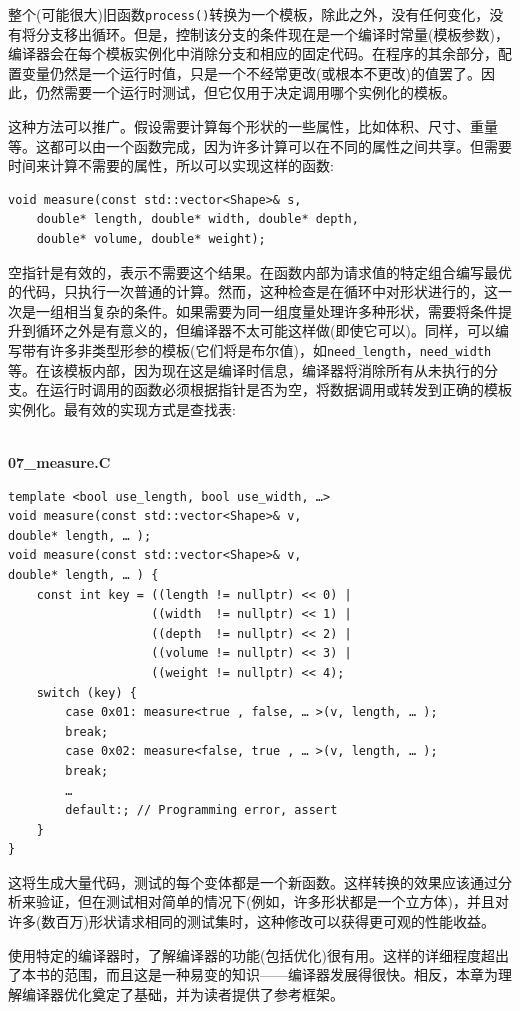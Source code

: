 整个(可能很大)旧函数\texttt{process()}转换为一个模板，除此之外，没有任何变化，没有将分支移出循环。但是，控制该分支的条件现在是一个编译时常量(模板参数)，编译器会在每个模板实例化中消除分支和相应的固定代码。在程序的其余部分，配置变量仍然是一个运行时值，只是一个不经常更改(或根本不更改)的值罢了。因此，仍然需要一个运行时测试，但它仅用于决定调用哪个实例化的模板。

这种方法可以推广。假设需要计算每个形状的一些属性，比如体积、尺寸、重量等。这都可以由一个函数完成，因为许多计算可以在不同的属性之间共享。但需要时间来计算不需要的属性，所以可以实现这样的函数:

\begin{lstlisting}[style=styleCXX]
void measure(const std::vector<Shape>& s,
	double* length, double* width, double* depth,
	double* volume, double* weight);
\end{lstlisting}

空指针是有效的，表示不需要这个结果。在函数内部为请求值的特定组合编写最优的代码，只执行一次普通的计算。然而，这种检查是在循环中对形状进行的，这一次是一组相当复杂的条件。如果需要为同一组度量处理许多种形状，需要将条件提升到循环之外是有意义的，但编译器不太可能这样做(即使它可以)。同样，可以编写带有许多非类型形参的模板(它们将是布尔值)，如\texttt{need\_length}，\texttt{need\_width}等。在该模板内部，因为现在这是编译时信息，编译器将消除所有从未执行的分支。在运行时调用的函数必须根据指针是否为空，将数据调用或转发到正确的模板实例化。最有效的实现方式是查找表:

\hspace*{\fill} \\ %
\noindent
\textbf{07\_measure.C}
\begin{lstlisting}[style=styleCXX]
template <bool use_length, bool use_width, …>
void measure(const std::vector<Shape>& v,
double* length, … );
void measure(const std::vector<Shape>& v,
double* length, … ) {
	const int key = ((length != nullptr) << 0) |
					((width  != nullptr) << 1) |
				    ((depth  != nullptr) << 2) |
				    ((volume != nullptr) << 3) |
				    ((weight != nullptr) << 4);
	switch (key) {
		case 0x01: measure<true , false, … >(v, length, … );
		break;
		case 0x02: measure<false, true , … >(v, length, … );
		break;
		…
		default:; // Programming error, assert
	}
}
\end{lstlisting}

这将生成大量代码，测试的每个变体都是一个新函数。这样转换的效果应该通过分析来验证，但在测试相对简单的情况下(例如，许多形状都是一个立方体)，并且对许多(数百万)形状请求相同的测试集时，这种修改可以获得更可观的性能收益。 

使用特定的编译器时，了解编译器的功能(包括优化)很有用。这样的详细程度超出了本书的范围，而且这是一种易变的知识——编译器发展得很快。相反，本章为理解编译器优化奠定了基础，并为读者提供了参考框架。


